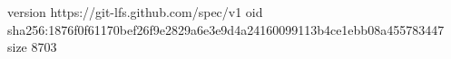 version https://git-lfs.github.com/spec/v1
oid sha256:1876f0f61170bef26f9e2829a6e3e9d4a24160099113b4ce1ebb08a455783447
size 8703
